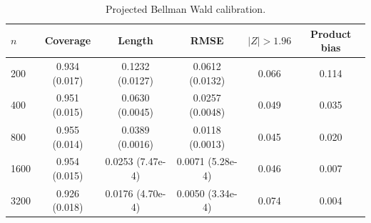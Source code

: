 \begin{table}[t]
\centering
\small
\setlength{\tabcolsep}{5pt}
\caption{Projected Bellman Wald calibration.}
\label{tab:generated-bellman-b2-wald}
\begin{tabular}{lccccc}
\toprule
$n$ & Coverage & Length & RMSE & $|Z|>1.96$ & Product bias \\
\midrule
200 & 0.934 (0.017) & 0.1232 (0.0127) & 0.0612 (0.0132) & 0.066 & 0.114 \\
400 & 0.951 (0.015) & 0.0630 (0.0045) & 0.0257 (0.0048) & 0.049 & 0.035 \\
800 & 0.955 (0.014) & 0.0389 (0.0016) & 0.0118 (0.0013) & 0.045 & 0.020 \\
1600 & 0.954 (0.015) & 0.0253 (7.47e-4) & 0.0071 (5.28e-4) & 0.046 & 0.007 \\
3200 & 0.926 (0.018) & 0.0176 (4.70e-4) & 0.0050 (3.34e-4) & 0.074 & 0.004 \\
\bottomrule
\end{tabular}
\end{table}

